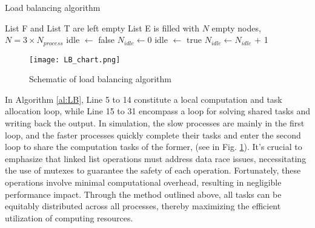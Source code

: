 \LinesNumbered
\begin{algorithm}[H]
    \caption{Load balancing algorithm} \label{al:LB}
    List F and List T are left empty \;
    List E is filled with $N$ empty nodes, $N = 3 \times N_{process} $ \; 
    idle $\gets$ false\;
    $N_{idle} \gets 0$\;
    {
    {
        idle $\gets $ true\;
        $N_{idle} \gets   N_{idle}$ + 1\;
    }
    }
\end{algorithm}



\begin{figure}[htbp]
    \centering
\texttt{[image: LB\_chart.png]} 
\caption{Schematic of load balancing algorithm}
\label{MPI_LB} 
\end{figure}


In Algorithm \ref{al:LB}, Line 5 to 14 constitute a local computation and task allocation loop, while Line 15 to 31 encompass a loop for solving shared tasks and writing back the output. In simulation, the slow processes are mainly in the first loop, and the faster processes quickly complete their tasks and enter the second loop to share the computation tasks of the former, (see in Fig. \ref{MPI_LB}).  %
It's crucial to emphasize that linked list operations must address data race issues, necessitating the use of mutexes to guarantee the safety of each operation. Fortunately, these operations involve minimal computational overhead, resulting in negligible performance impact.
Through the method outlined above, all tasks can be equitably distributed across all processes, thereby maximizing the efficient utilization of computing resources.


